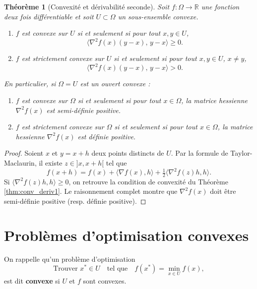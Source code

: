 \documentclass[a4paper,12pt,openany]{book}
\theoremstyle{plain}
\newtheorem{theorem}{Théorème}[section]
\theoremstyle{definition}
\theoremstyle{remark}
\theoremstyle{nbstyle}
\newcommand{\R}{\mathbb{R}}
\begin{document}
	\begin{theorem}[Convexité et dérivabilité seconde]\label{thm:conv_deriv2}
		Soit $f : \Omega \to \R$ une fonction deux fois différentiable et soit $U \subset \Omega$ un sous-ensemble convexe.
		\begin{enumerate}%
			\item $f$ est convexe sur $U$ si et seulement si pour tout $x,y \in U$,
			\[
			\langle \nabla^2 f(x)(y-x), \, y-x \rangle \geq 0.
			\]
			\item $f$ est strictement convexe sur $U$ si et seulement si pour tout $x,y \in U$, $x \neq y$,
			\[
			\langle \nabla^2 f(x)(y-x), \, y-x \rangle > 0.
			\]
		\end{enumerate}
		En particulier, si $\Omega = U$ est un ouvert convexe :
		\begin{enumerate}%
			\item $f$ est convexe sur $\Omega$ si et seulement si pour tout $x \in \Omega$, la matrice hessienne $\nabla^2 f(x)$ est semi-définie positive.
			\item $f$ est strictement convexe sur $\Omega$ si et seulement si pour tout $x \in \Omega$, la matrice hessienne $\nabla^2 f(x)$ est définie positive.
		\end{enumerate}
	\end{theorem}
	
	\begin{proof}%
		Soient $x$ et $y=x+h$ deux points distincts de $U$. Par la formule de Taylor-Maclaurin, il existe $z \in ]x,x+h[$ tel que
		\[
		f(x+h) = f(x) + \langle \nabla f(x), h \rangle + \tfrac12 \langle \nabla^2 f(z)h, h \rangle.
		\]
		Si $\langle \nabla^2 f(z)h, h \rangle \geq 0$, on retrouve la condition de convexité du Théorème \ref{thm:conv_deriv1}.  
		Le raisonnement complet montre que $\nabla^2 f(x)$ doit être semi-définie positive (resp. définie positive).
	\end{proof}
	
	\section{Problèmes d’optimisation convexes}
	
	On rappelle qu’un problème d’optimisation
	\[
	\text{Trouver } x^* \in U \quad \text{tel que} \quad f(x^*) = \displaystyle\min_{x \in U} f(x),
	\]
	est dit \textbf{convexe} si $U$ et $f$ sont convexes.  
	
\end{document}
